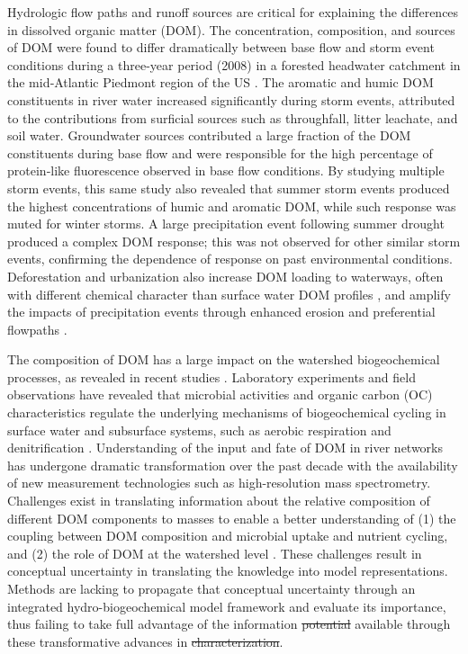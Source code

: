 \documentclass[preprint,review, 12pt]{elsarticle}
\providecommand{\DIFadd}[1]{{\protect\color{blue}\uwave{#1}}} %
\providecommand{\DIFdel}[1]{{\protect\color{red}\sout{#1}}}                      %
\providecommand{\DIFaddbegin}{} %
\providecommand{\DIFaddend}{} %
\providecommand{\DIFdelbegin}{} %
\providecommand{\DIFdelend}{} %
\newcommand{\DIFscaledelfig}{0.5}
\newlength{\DIFdelgraphicswidth} %
\newlength{\DIFdelgraphicsheight} %
\newcommand{\DIFaddincludegraphics}[2][]{{\color{blue}\fbox{\DIFOincludegraphics[#1]{#2}}}} %
\newcommand{\DIFdelincludegraphics}[2][]{%
\sbox{\DIFdelgraphicsbox}{\DIFOincludegraphics[#1]{#2}}%
\settoboxwidth{\DIFdelgraphicswidth}{\DIFdelgraphicsbox} %
\settoboxtotalheight{\DIFdelgraphicsheight}{\DIFdelgraphicsbox} %
\scalebox{\DIFscaledelfig}{%
\parbox[b]{\DIFdelgraphicswidth}{\usebox{\DIFdelgraphicsbox}\\[-\baselineskip] \rule{\DIFdelgraphicswidth}{0em}}\llap{\resizebox{\DIFdelgraphicswidth}{\DIFdelgraphicsheight}{%
\setlength{\unitlength}{\DIFdelgraphicswidth}%
\begin{picture}(1,1)%
\thicklines\linethickness{2pt} %
{\color[rgb]{1,0,0}\put(0,0){\framebox(1,1){}}}%
{\color[rgb]{1,0,0}\put(0,0){\line( 1,1){1}}}%
{\color[rgb]{1,0,0}\put(0,1){\line(1,-1){1}}}%
\end{picture}%
}\hspace*{3pt}}} %
} %
\DeclareRobustCommand{\DIFaddbegin}{\DIFOaddbegin \let\includegraphics\DIFaddincludegraphics} %
\DeclareRobustCommand{\DIFaddend}{\DIFOaddend \let\includegraphics\DIFOincludegraphics} %
\DeclareRobustCommand{\DIFdelbegin}{\DIFOdelbegin \let\includegraphics\DIFdelincludegraphics} %
\DeclareRobustCommand{\DIFdelend}{\DIFOaddend \let\includegraphics\DIFOincludegraphics} %
\begin{document}
Hydrologic flow paths and runoff sources are critical for explaining the differences in dissolved organic matter (DOM). The concentration, composition, and sources of DOM were found to differ dramatically between base flow and storm event conditions during a three{-}year period (2008) in a forested headwater catchment in the mid{‐}Atlantic Piedmont region of the US \citep{Inamdar2011}. The aromatic and humic DOM constituents in river water increased significantly during storm events, attributed to the contributions from surficial sources such as throughfall, litter leachate, and soil water. Groundwater sources contributed a large fraction of the DOM constituents during base flow and were responsible for the high percentage of protein‐like fluorescence observed in base flow conditions. By studying multiple storm events, this same study \citep{Inamdar2011} also revealed that summer storm events produced the highest concentrations of humic and aromatic DOM, while such response was muted for winter storms. A large precipitation event following summer drought produced a complex DOM response; this was not observed for other similar storm events, confirming the dependence of response on past environmental conditions. Deforestation and urbanization also increase DOM loading to waterways, often with different chemical character than surface water DOM profiles \citep{Williams2010, Wilson2009, Fu2007, McEnroe2013}, and amplify the impacts of precipitation events through enhanced erosion and preferential flowpaths \citep{Burns2012, Heaney1984, Paul2001, Hawley2016}.

The composition of DOM has a large impact on the watershed biogeochemical processes, as revealed in recent studies \citep{Stegen2018,Goldman2017a,Graham2017d, Graham2018}. Laboratory experiments and field observations have revealed that microbial activities and organic carbon (OC) characteristics regulate the underlying mechanisms of biogeochemical cycling in surface water and subsurface systems, such as aerobic respiration and denitrification \citep{Stegen2018,Goldman2017a,Graham2017d, Graham2018}. Understanding of the input and fate of DOM in river networks has undergone dramatic transformation over the past decade with the availability of new measurement technologies such as high-resolution mass spectrometry. Challenges exist in translating information about the relative composition of different DOM components to masses to enable a better understanding of (1) the coupling between DOM composition and microbial uptake and nutrient cycling, and (2) the role of DOM at the watershed level \citep{Inamdar2011}. These challenges result in conceptual uncertainty in translating the knowledge into model representations. Methods are lacking to propagate that conceptual uncertainty through an integrated hydro-biogeochemical model framework and evaluate its importance, thus failing to take full advantage of the information \DIFdelbegin \DIFdel{potential }\DIFdelend \DIFaddbegin \DIFadd{potentially }\DIFaddend available through these transformative advances in \DIFdelbegin \DIFdel{characterization}\DIFdelend \DIFaddbegin \DIFadd{characterizing molecular properties}\DIFaddend .
\end{document}
